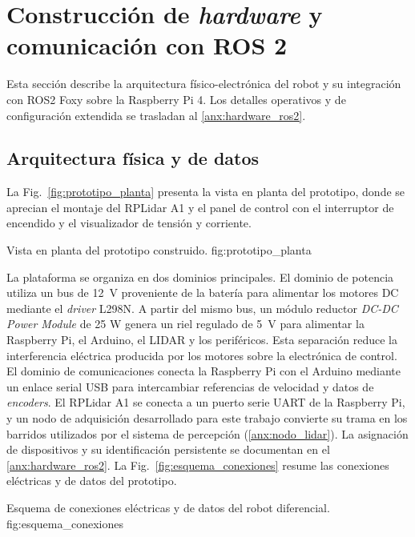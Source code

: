 \section{Construcción de \texorpdfstring{\textit{hardware}}{hardware} y comunicación con ROS 2}
\label{chap:robot_real}

Esta sección describe la arquitectura físico-electrónica del robot y su integración con \gls{ROS2} Foxy sobre la Raspberry Pi 4. Los detalles operativos y de configuración extendida se trasladan al \ref{anx:hardware_ros2}.

\subsection{Arquitectura física y de datos}

La Fig.~\ref{fig:prototipo_planta} presenta la vista en planta del prototipo,
donde se aprecian el montaje del RPLidar A1 y el panel de control con el
interruptor de encendido y el visualizador de tensión y corriente.

{Vista en planta del prototipo construido.}
{fig:prototipo_planta}

La plataforma se organiza en dos dominios principales. El dominio de potencia
utiliza un bus de 12~V proveniente de la batería para alimentar los motores DC
mediante el \textit{driver} L298N. A partir del mismo bus, un módulo reductor
\textit{DC-DC Power Module} de 25 W genera un riel regulado de 5~V para
alimentar la Raspberry Pi, el \gls{Arduino}, el \gls{LIDAR} y los
periféricos. Esta separación reduce la interferencia eléctrica producida por los motores sobre la electrónica de control.
El dominio de comunicaciones conecta la Raspberry Pi con el
\gls{Arduino} mediante un enlace serial USB para intercambiar referencias de
velocidad y datos de \textit{encoders}. El RPLidar A1 se conecta a un puerto serie UART
de la Raspberry Pi, y un nodo de adquisición desarrollado para este trabajo
convierte su trama en los barridos utilizados por el sistema de percepción
(\ref{anx:nodo_lidar}). La asignación de dispositivos y su
identificación persistente se documentan en el \ref{anx:hardware_ros2}. La
Fig.~\ref{fig:esquema_conexiones} resume las conexiones eléctricas y de
datos del prototipo.

{Esquema de conexiones eléctricas y de datos del robot diferencial.}
{fig:esquema_conexiones}

